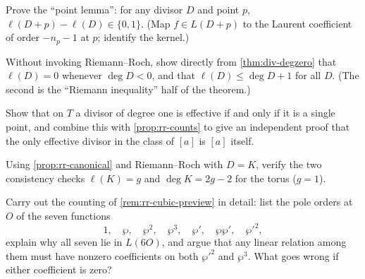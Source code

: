 \begin{exercise}
\label{ex:rr-point-lemma}
Prove the ``point lemma'': for any divisor \(D\) and point \(p\),
\(\ell(D + p) - \ell(D) \in \{0, 1\}\). (Map \(f \in L(D+p)\) to the Laurent
coefficient of order \(-n_p - 1\) at \(p\); identify the kernel.)
\end{exercise}

\begin{exercise}
\label{ex:rr-neg-degree}
Without invoking Riemann--Roch, show directly from \cref{thm:div-degzero} that
\(\ell(D) = 0\) whenever \(\deg D < 0\), and that \(\ell(D) \le \deg D + 1\) for
all \(D\). (The second is the ``Riemann inequality'' half of the theorem.)
\end{exercise}

\begin{exercise}
\label{ex:rr-degree-one-unique}
Show that on \(T\) a divisor of degree one is effective if and only if it is a
single point, and combine this with \cref{prop:rr-counts} to give an independent
proof that the only effective divisor in the class of \([a]\) is \([a]\) itself.
\end{exercise}

\begin{exercise}
\label{ex:rr-canonical-deg}
Using \cref{prop:rr-canonical} and Riemann--Roch with \(D = K\), verify the two
consistency checks \(\ell(K) = g\) and \(\deg K = 2g - 2\) for the torus
(\(g = 1\)).
\end{exercise}

\begin{exercise}
\label{ex:rr-cubic-count}
Carry out the counting of \cref{rem:rr-cubic-preview} in detail: list the pole
orders at \(O\) of the seven functions
\[
  1,\quad \wp,\quad \wp^2,\quad \wp^3,\quad \wp',\quad \wp\wp',\quad \wp'^2,
\]
explain why all seven lie in \(L(6O)\), and argue that any linear relation among
them must have nonzero coefficients on both \(\wp'^2\) and \(\wp^3\). What goes
wrong if either coefficient is zero?
\end{exercise}
